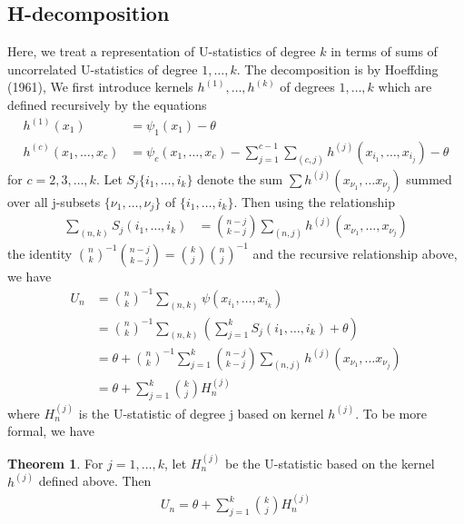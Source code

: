 \documentclass{article}
\theoremstyle{definition}
\newtheorem{theorem}{Theorem}
\numberwithin{Def}{section}
\begin{document}
\subsection{H-decomposition}
Here, we treat a representation of U-statistics of degree $k$ in terms of sums of uncorrelated U-statistics of degree $1, \dotsc, k$. The decomposition is by Hoeffding (1961), We first introduce kernels $h^{(1)}, \dotsc, h^{(k)}$ of degrees $1, \dotsc, k$ which are defined recursively by the equations 
\begin{align}
    h^{(1)}(x_1) &= \psi_1(x_1) - \theta \\
    h^{(c)}(x_1, \dotsc, x_c) &= \psi_c(x_1, \dotsc, x_c) - \sum_{j=1}^{c-1}\sum_{(c,j)}h^{(j)}(x_{i_1}, \dotsc, x_{i_j}) - \theta
\end{align}
for $c = 2, 3, \dotsc, k$. Let $S_j\{i_1, \dotsc, i_k\}$ denote the sum $\sum h^{(j)}(x_{\nu_1}, \dotsc x_{\nu_j})$ summed over all j-subsets $\{\nu_1, \dotsc, \nu_j\}$ of $\{i_1, \dotsc, i_k\}$. Then using the relationship
\begin{align}
    \sum_{(n,k)}S_j(i_1, \dotsc, i_k) &= {n-j \choose k-j} \sum_{(n,j)}h^{(j)}(x_{\nu_1}, \dotsc, x_{\nu_j})
\end{align}
the identity ${n \choose k}^{-1}{n-j \choose k-j} = {k \choose j}{n \choose j}^{-1}$ and the recursive relationship above, we have
\begin{align*}
    U_n &= {n \choose k}^{-1}\sum_{(n,k)}\psi(x_{i_1}, \dotsc, x_{i_k})\\
    &= {n \choose k}^{-1}\sum_{(n,k)}(\sum_{j=1}^kS_j(i_1, \dotsc, i_k) + \theta)\\
    &= \theta + {n \choose k}^{-1}\sum_{j=1}^k{n-j \choose k-j}\sum_{(n,j)}h^{(j)}(x_{\nu_1}, \dotsc x_{\nu_j}) \\
    &=\theta + \sum_{j=1}^k{k \choose j}H_n^{(j)}
\end{align*}
where $H_n^{(j)}$ is the U-statistic of degree j based on kernel $h^{(j)}$. To be more formal, we have

\begin{theorem}
For $j = 1, \dotsc, k$, let $H_n^{(j)}$ be the U-statistic based on the kernel $h^{(j)}$ defined above. Then 
\begin{align}
    U_n  = \theta + \sum_{j=1}^k {k \choose j}H_n^{(j)}
\end{align}
\end{theorem}
\end{document}
